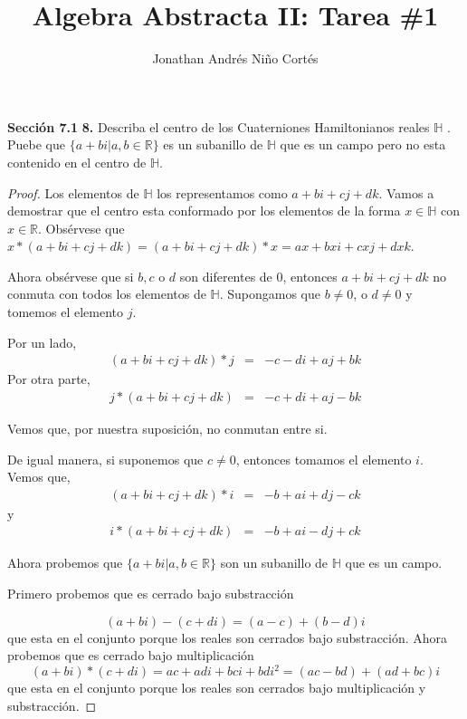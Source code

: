 \documentclass[letter,twoside,12pt]{article}
\title{Algebra Abstracta II: Tarea \#1}
\author{Jonathan Andr\'es Ni\~no Cort\'es}
\begin{document}
\maketitle
\textbf{Secci\'on 7.1} \textbf{8.} Describa el centro de los Cuaterniones Hamiltonianos reales $\mathbb{H}$ . Puebe que $\{a+bi |a,b \in \mathbb{R}\}$ es un subanillo de $\mathbb{H}$ que es un campo pero no esta contenido en el centro de $\mathbb{H}$.
\begin{proof}
Los elementos de $\mathbb{H}$ los representamos como $a+bi+cj+dk$.
Vamos a demostrar que el centro esta conformado por los elementos de la forma $x \in \mathbb{H}$ con $x \in \mathbb{R}$. Obs\'ervese que $x*(a+bi+cj+dk)= (a+bi+cj+dk)*x=ax+bxi+cxj+dxk$.

 Ahora obs\'ervese que si $b,c$ o $d$ son diferentes de 0, entonces $a+bi+cj+dk$  no conmuta con todos los elementos de $\mathbb{H}$. Supongamos que $b\not =0$, o $d\not =0$ y tomemos el elemento $j$.

Por un lado,
\begin{eqnarray}
(a+bi+cj+dk)*j&=&-c-di+aj+bk \nonumber
\end{eqnarray}
Por otra parte,
\begin{eqnarray}
j*(a+bi+cj+dk)&=&-c+di+aj-bk \nonumber
\end{eqnarray}

Vemos que, por nuestra suposici\'on, no conmutan entre si.

De igual manera, si suponemos que $c \not = 0$, entonces tomamos el elemento $i$.
Vemos que,
\begin{eqnarray}
(a+bi+cj+dk)*i&=&-b+ai+dj-ck \nonumber
\end{eqnarray}
y
\begin{eqnarray}
i*(a+bi+cj+dk)&=&-b+ai-dj+ck \nonumber
\end{eqnarray}

Ahora probemos que $\{a+bi|a,b \in \mathbb{R}\}$ son un subanillo de $\mathbb{H}$ que es un campo.

Primero probemos que es cerrado bajo substracci\'on

\begin{equation}
(a+bi)-(c+di) =(a-c)+(b-d)i \nonumber
\end{equation}
que esta en el conjunto porque los reales son cerrados bajo substracci\'on.
Ahora probemos que es cerrado bajo multiplicaci\'on
\begin{equation}
(a+bi)*(c+di)=ac+adi+bci+bdi^2=(ac-bd)+(ad+bc)i \nonumber
\end{equation}
que esta en el conjunto porque los reales son cerrados bajo multiplicaci\'on y substracci\'on.
\end{proof}
\end{document}
